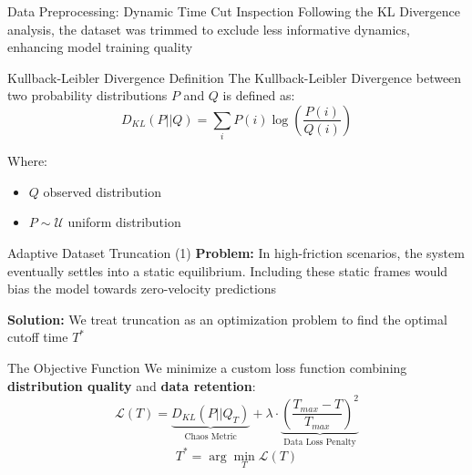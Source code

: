 \begin{frame}{Data Preprocessing: Dynamic Time Cut Inspection}
    Following the KL Divergence analysis, the dataset was trimmed to exclude less informative dynamics, enhancing model training quality
   
    \begin{block}{Kullback-Leibler Divergence Definition}
        The Kullback-Leibler Divergence between two probability distributions $P$ and $Q$ is defined as:
        \begin{equation}
            D_{KL}(P || Q) = \sum_{i} P(i) \log\left(\frac{P(i)}{Q(i)}\right)
        \end{equation}

        Where: 

        \begin{itemize}
            \item $ Q $ observed distribution
            \item $ P \sim \mathcal{U}$ uniform distribution
        \end{itemize}
        
    \end{block}
\end{frame}



\begin{frame}{Adaptive Dataset Truncation (1)}
    \textbf{Problem:} In high-friction scenarios, the system eventually settles into a static equilibrium. Including these static frames would bias the model towards zero-velocity predictions
    
    \vspace{0.2cm}
    \textbf{Solution:} We treat truncation as an optimization problem to find the optimal cutoff time $T^*$
    
    \begin{block}{The Objective Function}
        We minimize a custom loss function combining \textbf{distribution quality} and \textbf{data retention}:
        \centering
        \begin{equation}
            \mathcal{L}(T) = \underbrace{D_{KL}( P || Q_T)}_{\text{Chaos Metric}} + \lambda \cdot \underbrace{\left( \frac{T_{max} - T}{T_{max}} \right)^2}_{\text{Data Loss Penalty}}
        \end{equation}  
        \begin{equation}
            T^* = \arg\min_{T} \mathcal{L}(T)
        \end{equation} 
    \end{block}
\end{frame}

